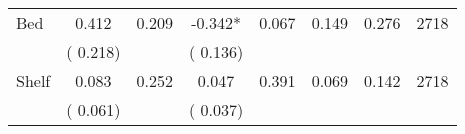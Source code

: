 \begin{tabular}{l*{7}{c}}
 Bed       &              0.412       &        0.209  &             -0.342*       &        0.067  &              0.149       &              0.276 &  2718 \\ 
                       &       (       0.218)             &                               &       (       0.136)                     &                               &                                               &                                &                      \\ 

 Shelf       &              0.083       &        0.252  &              0.047       &        0.391  &              0.069       &              0.142 &  2718 \\ 
                       &       (       0.061)             &                               &       (       0.037)                     &                               &                                               &                                &                      \\ 

\hline \end{tabular}